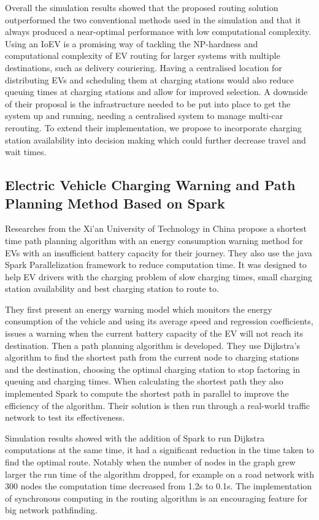\documentclass[11pt]{report}
\begin{document}
Overall the simulation results showed that the proposed routing solution outperformed the two conventional methods used in the simulation and that it always produced a near-optimal performance with low computational complexity. Using an IoEV is a promising way of tackling the NP-hardness and computational complexity of EV routing for larger systems with multiple destinations, such as delivery couriering. Having a centralised location for distributing EVs and scheduling them at charging stations would also reduce queuing times at charging stations and allow for improved selection. A downside of their proposal is the infrastructure needed to be put into place to get the system up and running, needing a centralised system to manage multi-car rerouting. To extend their implementation, we propose to incorporate charging station availability into decision making which could further decrease travel and wait times.

\subsection{Electric Vehicle Charging Warning and Path Planning Method Based on Spark \autocite{sparkEVChargingDing}}

Researches from the Xi’an University of Technology in China propose a shortest time path planning algorithm with an energy consumption warning method for EVs with an insufficient battery capacity for their journey. They also use the java Spark Parallelization framework \autocite{spark} to reduce computation time. It was designed to help EV drivers with the charging problem of slow charging times, small charging station availability and best charging station to route to.

They first present an energy warning model which monitors the energy consumption of the vehicle and using its average speed and regression coefficients, issues a warning when the current battery capacity of the EV will not reach its destination. Then a path planning algorithm is developed. They use Dijkstra's algorithm to find the shortest path from the current node to charging stations and the destination, choosing the optimal charging station to stop factoring in queuing and charging times. When calculating the shortest path they also implemented Spark to compute the shortest path in parallel to improve the efficiency of the algorithm. Their solution is then run through a real-world traffic network to test its effectiveness.

Simulation results showed with the addition of Spark to run Dijkstra computations at the same time, it had a significant reduction in the time taken to find the optimal route. Notably when the number of nodes in the graph grew larger the run time of the algorithm dropped, for example on a road network with 300 nodes the computation time decreased from 1.2s to 0.1s. The implementation of synchronous computing in the routing algorithm is an encouraging feature for big network pathfinding.
\end{document}

